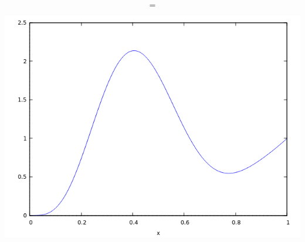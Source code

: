 \documentclass{beamer}
\begin{document}
\begin{frame}[fragile]
\begin{columns}
\end{columns}

$$=$$

\begin{center}\includegraphics[scale=0.2]{images/Beta_mixed_4_6_3_0_c_0_1_alpha.png}\end{center}

\end{frame}








\end{document}
